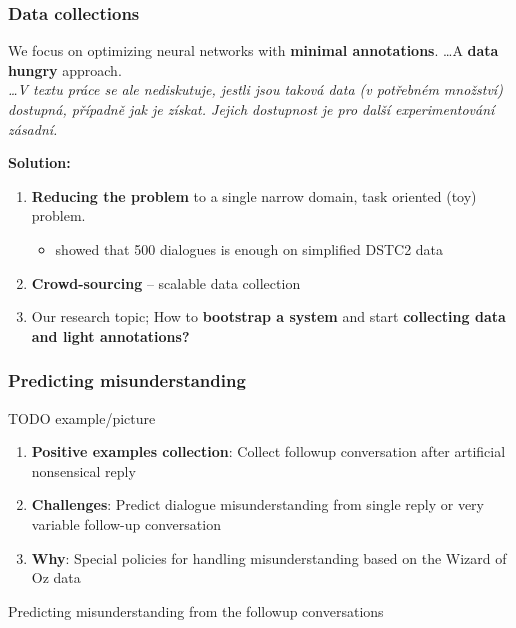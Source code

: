 \documentclass[10pt, compress,british,xcolor={svgnames,dvipsnames,x11names},trans]{beamer}
\begin{document}
\begin{frame}\frametitle{Data collections}
    We focus on optimizing neural networks with {\bf minimal annotations}. \ldots A {\bf data hungry} approach. \\
    {\footnotesize \it \dots V textu práce se ale nediskutuje, jestli jsou taková data (v potřebném množství) dostupná, případně jak je získat. Jejich dostupnost je pro další experimentování zásadní.}
    
    {\bf \color{darkgreen} Solution:}\\
    \begin{enumerate}
        \item {\bf Reducing the problem} to a single narrow domain, task oriented (toy) problem.
            \begin{itemize}
                \item \citet{wen_networkbased_2016} showed that 500 dialogues is enough on simplified DSTC2 data
            \end{itemize}
        \item {\bf Crowd-sourcing} -- scalable data collection
        \item Our research topic; How to {\bf bootstrap a system} and start {\bf collecting data and light annotations?}
    \end{enumerate}
\end{frame}


\begin{frame}\frametitle{Predicting misunderstanding}
    TODO example/picture
    \begin{enumerate}
        \item {\bf Positive examples collection}: Collect followup conversation after artificial nonsensical reply \\
        \item {\bf Challenges}: Predict dialogue misunderstanding from single reply or very variable follow-up conversation \\ 
        \item {\bf Why}: Special policies for handling misunderstanding based on the Wizard of Oz data 
    \end{enumerate}
    Predicting misunderstanding from the followup conversations
\end{frame}
\end{document}
